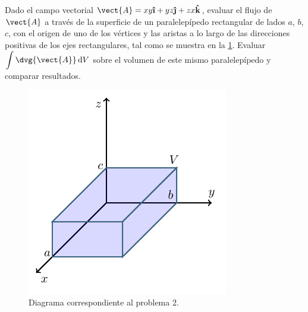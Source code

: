 \documentclass[./../main.tex]{subfiles}
\begin{document}
    \section{}
    Dado el campo vectorial \(\vect{A} = xy\uveci + yz\uvecj + zx\uveck\), evaluar el flujo de \(\vect{A}\) a través de la superficie de un paralelepípedo rectangular de lados \(a\), \(b\), \(c\), con el origen de uno de los vértices y las aristas a lo largo de las direcciones positivas de los ejes rectangulares, tal como se muestra en la \cref{fig:surfaceProblem2}. Evaluar \(\displaystyle\int \dvg{\vect{A}}\odif{V}\) sobre el volumen de este mismo paralelepípedo y comparar resultados.

    \begin{figure}[htb]
        \centering
        \includegraphics[scale=1.1]{diagram-problem-2.pdf}
        \caption{Diagrama correspondiente al problema 2.}
        \label{fig:surfaceProblem2}
    \end{figure}
\end{document}
